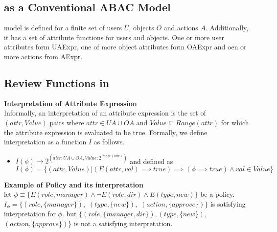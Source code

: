 
\newcommand{\phiu}{\phi_{u}}
\newcommand{\phio}{\phi_{o}}
\newcommand{\phia}{\phi_{a}}
\newcommand{\phip}{\phi_{p}}
\newcommand{\phix}{\phi_{x}}
\newcommand{\phiy}{\phi_{y}}
\newcommand{\userAttrExpr}{UAExpr}
\newcommand{\objectAttrExpr}{OAExpr}
\newcommand{\actionExpr}{AExpr}
\newcommand{\review}{acting\_users}
\newcommand{\simpleReview}{deep\_review}
\newcommand{\isSatisfiable}{is\_satisfiable}
\newcommand{\interpretationY}{I_y}
\newcommand{\interpretationX}{I_x}
\newcommand{\interpretation}{I}
\newcommand{\reductionAlgo}{CircuitSAT2PolicyReview}
\newcommand{\psiu}{\psi_{u}}



\subsection{\sABAC{} as a Conventional ABAC Model}
\sABAC{} model is defined for a finite set of users $U$, objects $O$ and actions $A$. Additionally, it has a set of attribute functions for users and objects. One or more user attributes form UAExpr, one of more object attributes form OAExpr and oen or more actions from AExpr.

	
	 
	


\subsection{Review Functions in \sABAC{}}
	

\textbf{Interpretation of Attribute Expression}\\
	Informally, an interpretation of an attribute expression  is the set of  $(attr,Value)$ pairs where $attr \in UA \cup OA$ and $Value \subseteq Range(attr)$ for which the attribute expression is evaluated to be true. Formally, we define interpretation as a function $\interpretation$ as follows.

\begin{itemize}
	\item $\interpretation(\phi) \to 2^{(attr: UA \cup OA,  Value: 2^{Range(attr)})}$ and  defined as \\
	$\interpretation(\phi) = \{(attr,Value) | (E(attr,val) \implies true ) \implies (\phi \implies true) \land val \in Value \}$
	
\end{itemize}
	
\noindent \textbf{Example of \sABAC{} Policy and its interpretation} \\
let $ \phi  \equiv \{ E(role, manager) \land \lnot E(role, dir) \land E(type, new) \}$ be a  \sABAC  policy. 	
$I_\phi = \{ (role,  \{ manager\}),$  $(type, \{ new\}), $   $(action, \{ approve\}) \}$ is satisfying interpretation for $\phi $. but $\{ (role,  \{ manager, dir\}) , (type, \{ new\}),$ \\ $(action, \{ approve\}) \}$ is not a satisfying interpretation. \\

